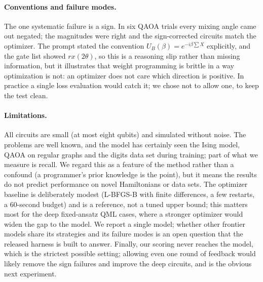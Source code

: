 \paragraph{Conventions and failure modes.}
The one systematic failure is a sign. In six QAOA trials every mixing angle came out negated; the magnitudes were right and the sign-corrected circuits match the optimizer. The prompt stated the convention $U_B(\beta) = e^{-i\beta\sum X}$ explicitly, and the gate list showed $rx(2\theta)$, so this is a reasoning slip rather than missing information, but it illustrates that weight programming is brittle in a way optimization is not: an optimizer does not care which direction is positive. In practice a single loss evaluation would catch it; we chose not to allow one, to keep the test clean.

\paragraph{Limitations.}
All circuits are small (at most eight qubits) and simulated without noise. The problems are well known, and the model has certainly seen the Ising model, QAOA on regular graphs and the digits data set during training; part of what we measure is recall. We regard this as a feature of the method rather than a confound (a programmer's prior knowledge is the point), but it means the results do not predict performance on novel Hamiltonians or data sets. The optimizer baseline is deliberately modest (L-BFGS-B with finite differences, a few restarts, a 60-second budget) and is a reference, not a tuned upper bound; this matters most for the deep fixed-ansatz QML cases, where a stronger optimizer would widen the gap to the model. We report a single model; whether other frontier models share its strategies and its failure modes is an open question that the released harness is built to answer. Finally, our scoring never reaches the model, which is the strictest possible setting; allowing even one round of feedback would likely remove the sign failures and improve the deep circuits, and is the obvious next experiment.
